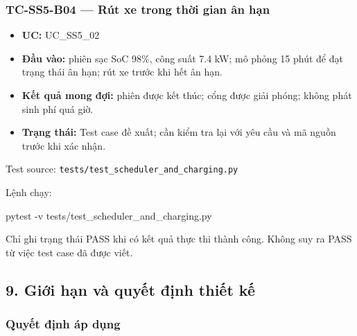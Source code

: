 \documentclass[11pt,a4paper]{article}
\providecommand{\tightlist}{%
  \setlength{\itemsep}{0pt}\setlength{\parskip}{0pt}}
\newenvironment{Shaded}{}{}
\newcommand{\AttributeTok}[1]{\textcolor[rgb]{0.49,0.56,0.16}{#1}}
\newcommand{\ExtensionTok}[1]{#1}
\newcommand{\NormalTok}[1]{#1}
\begin{document}
\hypertarget{tc-ss5-b04-ruxfat-xe-trong-thux1eddi-gian-uxe2n-hux1ea1n}{%
\subsubsection{TC-SS5-B04 --- Rút xe trong thời gian ân
hạn}\label{tc-ss5-b04-ruxfat-xe-trong-thux1eddi-gian-uxe2n-hux1ea1n}}

\begin{itemize}
\tightlist
\item
  \textbf{UC:} UC\_SS5\_02
\item
  \textbf{Đầu vào:} phiên sạc SoC 98\%, công suất 7.4 kW; mô phỏng 15
  phút để đạt trạng thái ân hạn; rút xe trước khi hết ân hạn.
\item
  \textbf{Kết quả mong đợi:} phiên được kết thúc; cổng được giải phóng;
  không phát sinh phí quá giờ.
\item
  \textbf{Trạng thái:} Test case đề xuất; cần kiểm tra lại với yêu cầu
  và mã nguồn trước khi xác nhận.
\end{itemize}

Test source: \texttt{tests/test\_scheduler\_and\_charging.py}

Lệnh chạy:

\begin{Shaded}
\begin{Highlighting}[]
\ExtensionTok{pytest} \AttributeTok{{-}v}\NormalTok{ tests/test\_scheduler\_and\_charging.py}
\end{Highlighting}
\end{Shaded}

Chỉ ghi trạng thái PASS khi có kết quả thực thi thành công. Không suy ra
PASS từ việc test case đã được viết.

\hypertarget{giux1edbi-hux1ea1n-vuxe0-quyux1ebft-ux111ux1ecbnh-thiux1ebft-kux1ebf}{%
\subsection{9. Giới hạn và quyết định thiết
kế}\label{giux1edbi-hux1ea1n-vuxe0-quyux1ebft-ux111ux1ecbnh-thiux1ebft-kux1ebf}}

\hypertarget{quyux1ebft-ux111ux1ecbnh-uxe1p-dux1ee5ng}{%
\subsubsection{Quyết định áp
dụng}\label{quyux1ebft-ux111ux1ecbnh-uxe1p-dux1ee5ng}}
\end{document}
